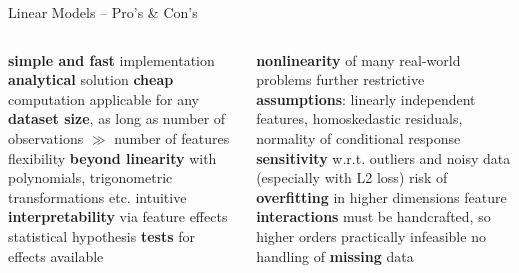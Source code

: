 \begin{frame}{Linear Models -- Pro's \& Con's}



\begin{columns}[onlytextwidth]
  \begin{column}{0.5\textwidth}
    
    \begin{itemize}
      \positem \textbf{simple and fast} implementation
      \positem \textbf{analytical} solution
      \positem \textbf{cheap} computation
      \positem applicable for any \textbf{dataset size}, as long as number of 
      observations $\gg$ number of features
      \positem flexibility \textbf{beyond linearity} with polynomials, 
      trigonometric transformations etc.
      \positem intuitive \textbf{interpretability} via feature effects
      \positem statistical hypothesis \textbf{tests} for effects available

    \end{itemize}
  \end{column}

  \begin{column}{0.5\textwidth}
    
    \begin{itemize}
      \negitem \textbf{nonlinearity} of many real-world problems
      \negitem further restrictive \textbf{assumptions}: linearly independent 
      features, homoskedastic residuals, normality of conditional response
      \negitem \textbf{sensitivity} w.r.t. outliers and noisy data (especially 
      with L2 loss)
      \negitem risk of \textbf{overfitting} in higher dimensions
      \negitem feature \textbf{interactions} must be handcrafted, so higher
      orders practically infeasible
      \negitem no handling of \textbf{missing} data
    \end{itemize}
  \end{column}
\end{columns}

\vfill

\small


\end{frame}


